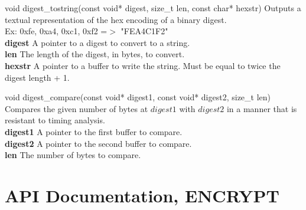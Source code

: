 \documentclass[titlepage]{article}
\begin{document}
			\begin{functionspec}[]{void digest\_tostring(const void* digest, size\_t len, const char* hexstr)}
				Outputs a textual representation of the hex encoding of a binary digest.\\
				Ex: 0xfe, 0xa4, 0xc1, 0xf2 =$>$ "FEA4C1F2"\\
				\textbf{digest} A pointer to a digest to convert to a string.\\
				\textbf{len} The length of the digest, in bytes, to convert.\\
				\textbf{hexstr} A pointer to a buffer to write the string. Must be equal to twice the digest length + 1.
			\end{functionspec}
			\vspace{1mm}
			\begin{functionspec}[]{void digest\_compare(const void* digest1, const void* digest2, size\_t len)}
				Compares the given number of bytes at $digest1$ with $digest2$ in a manner that is resistant to timing analysis.\\
				\textbf{digest1} A pointer to the first buffer to compare.\\
				\textbf{digest2} A pointer to the second buffer to compare.\\
				\textbf{len} The number of bytes to compare.
			\end{functionspec}
		\newpage
	\section{API Documentation, ENCRYPT}
\end{document}
